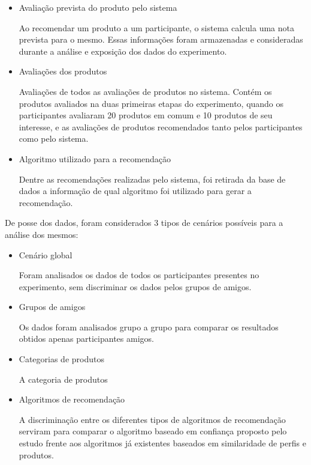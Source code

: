 \begin{itemize}
	\item Avaliação prevista do produto pelo sistema
	
	Ao recomendar um produto a um participante, o sistema calcula uma nota prevista para o mesmo. Essas informações foram armazenadas e consideradas durante a análise e exposição dos dados do experimento.
	
	\item Avaliações dos produtos
	
	Avaliações de todos as avaliações de produtos no sistema. Contém os produtos avaliados na duas primeiras etapas do experimento, quando os participantes avaliaram 20 produtos em comum e 10 produtos de seu interesse, e as avaliações de produtos recomendados tanto pelos participantes como pelo sistema.
	
	\item Algoritmo utilizado para a recomendação
	
	Dentre as recomendações realizadas pelo sistema, foi retirada da base de dados a informação de qual algoritmo foi utilizado para gerar a recomendação.
	
\end{itemize}

 De posse dos dados, foram considerados 3 tipos de cenários possíveis para a análise dos mesmos:
 
 \begin{itemize}
	\item Cenário global
	
	Foram analisados os dados de todos os participantes presentes no experimento, sem discriminar os dados pelos grupos de amigos.
	
	\item Grupos de amigos
	
	Os dados foram analisados grupo a grupo para comparar os resultados obtidos apenas participantes amigos.
	
	\item Categorias de produtos
	
	A categoria de produtos 
	
	\item Algoritmos de recomendação
	
	A discriminação entre os diferentes tipos de algoritmos de recomendação serviram para comparar o algoritmo baseado em confiança proposto pelo estudo frente aos algoritmos já existentes baseados em similaridade de perfis e produtos.
	
\end{itemize}

